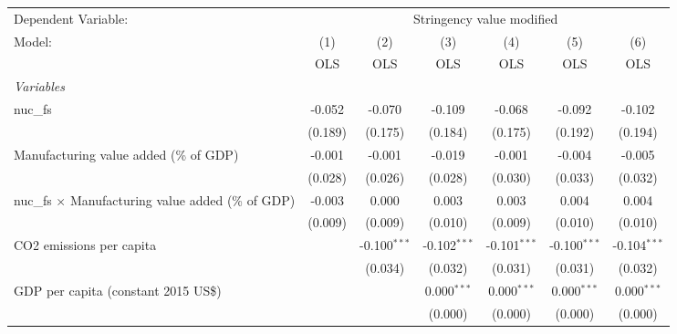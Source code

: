
\begingroup
\centering
\begin{tabular}{lcccccc}
   \toprule
   Dependent Variable: & \multicolumn{6}{c}{Stringency value modified}\\
   Model:                                                    & (1)     & (2)            & (3)            & (4)            & (5)            & (6)\\  
                                                             &  OLS    & OLS            & OLS            & OLS            & OLS            & OLS\\  
   \midrule
   \emph{Variables}\\
   nuc\_fs                                                   & -0.052  & -0.070         & -0.109         & -0.068         & -0.092         & -0.102\\   
                                                             & (0.189) & (0.175)        & (0.184)        & (0.175)        & (0.192)        & (0.194)\\   
   Manufacturing value added (\% of GDP)                     & -0.001  & -0.001         & -0.019         & -0.001         & -0.004         & -0.005\\   
                                                             & (0.028) & (0.026)        & (0.028)        & (0.030)        & (0.033)        & (0.032)\\   
   nuc\_fs $\times$ Manufacturing value added (\% of GDP)    & -0.003  & 0.000          & 0.003          & 0.003          & 0.004          & 0.004\\   
                                                             & (0.009) & (0.009)        & (0.010)        & (0.009)        & (0.010)        & (0.010)\\   
   CO2 emissions per capita                                  &         & -0.100$^{***}$ & -0.102$^{***}$ & -0.101$^{***}$ & -0.100$^{***}$ & -0.104$^{***}$\\   
                                                             &         & (0.034)        & (0.032)        & (0.031)        & (0.031)        & (0.032)\\   
   GDP per capita (constant 2015 US\$)                       &         &                & 0.000$^{***}$  & 0.000$^{***}$  & 0.000$^{***}$  & 0.000$^{***}$\\   
                                                             &         &                & (0.000)        & (0.000)        & (0.000)        & (0.000)\\   

\end{tabular}
